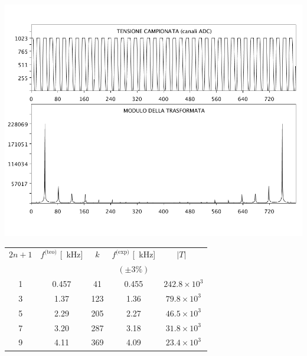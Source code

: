 \documentclass[10pt,oneside,a4paper]{article}
\newenvironment{Figure}
  {\par\medskip\noindent\minipage{\linewidth}}
  {\endminipage\par\medskip}
\begin{document}
\begin{multicols}{2}
\begin{Figure}
	\begin{center}
	\includegraphics[width=\linewidth]{quadraFiltro}
	\label{fig:quadraFiltro}
	\end{center}
\end{Figure}

\begin{table}
\label{tab:armoniche_quadra}
\centering
\begin{tabular}{c|c|c|c|c}
$2n+1$ & $f^\text{(teo)}$ [\SI{}{\kilo\Hz}] & $k$ & $f^\text{(exp)}$ [\SI{}{\kilo\Hz}] & $\vert T \vert$\ \\
 & & & $(\pm 3\%)$ &   \\ 
\hline		
1 		&	0.457	& 	41		&	0.455 	& 	$242.8\times10^3$	\\
3		&	1.37		& 	123		&	1.36		& 	$79.8\times10^3$\\
5		&	2.29		& 	205		&	2.27		& 	$46.5\times10^3$\\
7		&	3.20		& 	287		&	3.18		& 	$31.8\times10^3$\\
9 		&	4.11		& 	369		&	4.09		& 	$23.4\times10^3$\\
\hline
\end{tabular}
\end{table}


\end{multicols}
\end{document}
